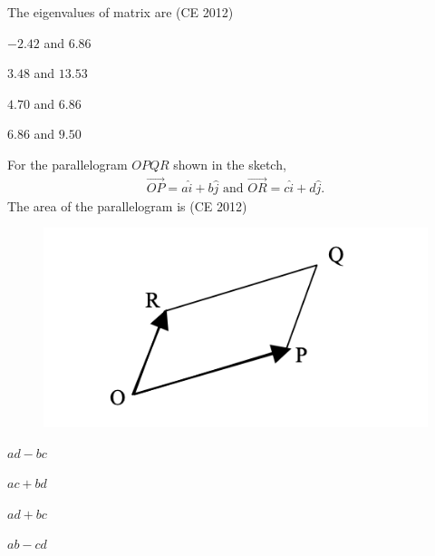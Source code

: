 \item The eigenvalues of matrix  are \hfill (CE  2012)
\begin{enumerate}
\begin{multicols}{4}
\item $-2.42$ and $6.86$
\item $3.48$ and $13.53$
\item $4.70$ and $6.86$
\item $6.86$ and $9.50$
\end{multicols}
\end{enumerate}
\item For the parallelogram $OPQR$ shown in the sketch, 
\begin{align*}
	\overrightarrow{OP}=a\hat{i}+b\hat{j} \text{ and } \overrightarrow{OR}=c\hat{i}+d\hat{j}.
\end{align*}
The area of the parallelogram is \hfill (CE  2012)
\begin{figure}[H]
    \centering
    \includegraphics[width=0.3\columnwidth]{GATE/2012/CE/figs/Q29.png} 
    \caption{}
    \label{fig:placeholder-2012-ce}
\end{figure}
\begin{enumerate}
\begin{multicols}{4}
\item $a d - b c$
\item $a c + b d$
\item $a d + b c$
\item $a b - c d$
\end{multicols}
\end{enumerate}
